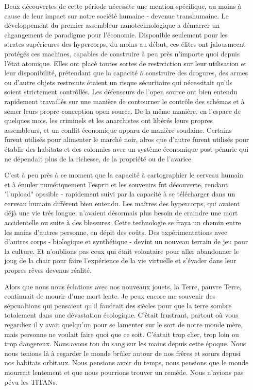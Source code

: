 Deux découvertes de cette période nécessite une mention spécifique, au moins à cause de leur impact sur notre société humaine - devenue transhumaine. Le développement du premier assembleur nanotechnologique a démarrer un chgangement de paradigme pour l'économie. Disponible seulement pour les strates supérieures des hypercorps, du moins au début, ces élites ont jalousmeent protégés ces machines, capables de construire à peu près n'importe quoi depuis l'état atomique. Elles ont placé toutes sortes de restrciction sur leur utilisation et leur disponibilité, prétendant que la capacité à construire des drogures, des armes ou d'autre objets restreints étaient un risque sécuritaire qui nécessitait qu'ils soient strictement contrôllés. Les défenseurs de l'open source ont bien entendu rapidement travaillés sur une manière de contourner le contrôle des schémas et à semer leurs propre conception open source. De la même manière, en l'espace de quelques mois, les criminels et les anarchistes ont libérés leurs propres assembleurs, et un conflit économique apparu de manière soudaine. Certains furent utilisés pour alimenter le marché noir, alros que d'autre furent utilisés pour établir des habitats et des colonnies avec un système économique post-pénurie qui ne dépendait plus de la richesse, de la propriété ou de l'avarice. 

C'est à peu près à ce moment que la capacité à cartographier le cerveau humain et à émuler numériquement l'esprit et les souvenirs fut découverte, rendant "l'upload" opssible - rapidement suivi par la capacité à se télécharger dans un cerveau humain différent bien entendu. Les maîtres des hypercorps, qui avaient déjà une vie trés longue, n'avaient désormais plus besoin de craindre une mort accidentelle ou suite à des blessures. Cette technologie se fraya un chemin entre les mains d'autres personne, en dépit des coûts. Des expérimentations avec d'autres corps - biologique et synthétique - devint un nouveau terrain de jeu pour la culture. Et n'oublions pas ceux qui était volontaire pour aller abandonner le joug de la chair pour faire l'expérience de la vie virtuelle et s'évader dans leur propres rêves devenus réalité. 

Alors que nous nous éclations avec nos nouveaux jouets, la Terre, pauvre Terre, continuait de mourir d'une mort lente. Je peux encore me souvenir des sépcualtions qui pensaient qu'il faudrait des siècles pour que la terre sombre totalement dans une dévastation écologique. C'était frustrant, partout où vous regardiez il y avait quelqu'un pour se lamenter sur le sort de notre monde mère, mais personne ne voulait faire quoi que ce soit. C'éatait trop cher, trop loin ou trop dangereux. Nous avons tou du sang sur les mains depuis cette époque. Nous nous tenions là à regarder le monde brûler autour de nos frêres et sœurs depusi nos habitats orbitaux. Nous pensions avoir du temps, nous pensions que le monde mourrait lentement et que nous pourrions trouver un remède. Nous n'avions pas pévu les TITANs. 

